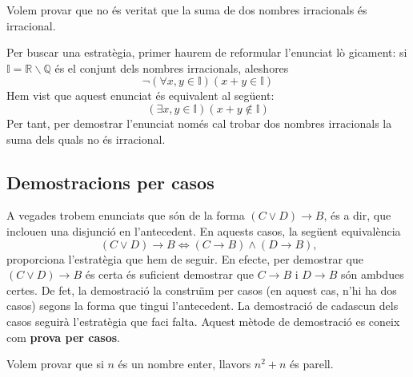 \begin{exemple}
Volem provar que no \'{e}s veritat que la suma de dos nombres irracionals
\'{e}s irracional.
\end{exemple}

\begin{solucio}
Per buscar una estrat\`{e}gia, primer haurem de reformular l'enunciat l\`{o}%
gicament: si $\mathbb{I}=\mathbb{R}\smallsetminus\mathbb{Q}$ \'{e}s el
conjunt dels nombres irracionals, aleshores%
\begin{equation*}
\lnot\left( \forall x,y\in\mathbb{I}\right) \left( x+y\in\mathbb{I}\right)
\end{equation*}
Hem vist que aquest enunciat \'{e}s equivalent al seg\"{u}ent:%
\begin{equation*}
\left( \exists x,y\in\mathbb{I}\right) \left( x+y\notin\mathbb{I}\right)
\end{equation*}
Per tant, per demostrar l'enunciat nom\'{e}s cal trobar dos nombres
irracionals la suma dels quals no \'{e}s irracional.
\end{solucio}

\subsection{Demostracions per casos}

A vegades trobem enunciats que s\'{o}n de la forma $\left( C\vee D\right)
\longrightarrow B$, \'{e}s a dir, que inclouen una disjunci\'{o} en
l'antecedent. En aquests casos, la seg\"{u}ent equival\`{e}ncia
\begin{equation*}
\left( C\vee D\right) \longrightarrow B\Longleftrightarrow\left(
C\longrightarrow B\right) \wedge\left( D\longrightarrow B\right) \text{,}
\end{equation*}
proporciona l'estrat\`{e}gia que hem de seguir. En efecte, per demostrar que
$\left( C\vee D\right) \longrightarrow B$ \'{e}s certa \'{e}s suficient
demostrar que $C\longrightarrow B$ i $D\longrightarrow B$ s\'{o}n ambdues
certes. De fet, la demostraci\'{o} la constru\"{\i}m per casos (en aquest
cas, n'hi ha dos casos) segons la forma que tingui l'antecedent. La
demostraci\'{o} de cadascun dels casos seguir\`{a} l'estrat\`{e}gia que faci
falta. Aquest m\`{e}tode de demostraci\'{o} es coneix com \textbf{prova per
casos}.

\begin{exemple}
Volem provar que si $n$ \'{e}s un nombre enter, llavors $n^{2}+n$ \'{e}s
parell.
\end{exemple}

